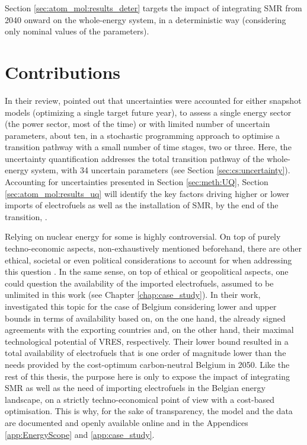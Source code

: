 Section \ref{sec:atom_mol:results_deter} targets the impact of integrating \gls{SMR} from 2040 onward on the whole-energy system, in a deterministic way (\ie considering only nominal values of the parameters). 

\section*{Contributions}
\label{sec:atom_mol:contributions}

In their review, \citet{yue2018review} pointed out that uncertainties were accounted for either snapshot models (\ie optimizing a single target future year), to assess a single energy sector (\ie the power sector, most of the time) or with limited number of uncertain parameters, \ie about ten, in a stochastic programming approach to optimise a transition pathway with a small number of time stages, \ie two or three. Here, the uncertainty quantification addresses the total transition pathway of the whole-energy system, with 34 uncertain parameters (see Section \ref{sec:cs:uncertainty}). Accounting for uncertainties presented in Section \ref{sec:meth:UQ}, Section \ref{sec:atom_mol:results_uq} will identify the key factors driving higher or lower imports of electrofuels as well as the installation of \gls{SMR}, by the end of the transition, .

Relying on nuclear energy for some is highly controversial. On top of purely techno-economic aspects, non-exhaustively mentioned beforehand, there are other ethical, societal or even political considerations to account for when addressing this question \cite{kempf2022}. In the same sense, on top of ethical or geopolitical aspects, one could question the availability of the imported electrofuels, assumed to be unlimited in this work (see Chapter \ref{chap:case_study}). In their work, \citet{lefebvre2022electrofuel} investigated this topic for the case of Belgium considering lower and upper bounds in terms of availability based on, on the one hand, the already signed agreements with the exporting countries and, on the other hand, their maximal technological potential of \gls{VRES}, respectively. Their lower bound resulted in a total availability of electrofuels that is one order of magnitude lower than the needs provided by the cost-optimum carbon-neutral Belgium in 2050. Like the rest of this thesis, the purpose here is only to expose the impact of integrating \gls{SMR} as well as the need of importing electrofuels in the Belgian energy landscape, on a strictly techno-economical point of view with a cost-based optimisation. This is why, for the sake of transparency, the model and the data are documented and openly available online \cite{readthedocs_pathway} and in the Appendices \ref{app:EnergyScope} and \ref{app:case_study}.

